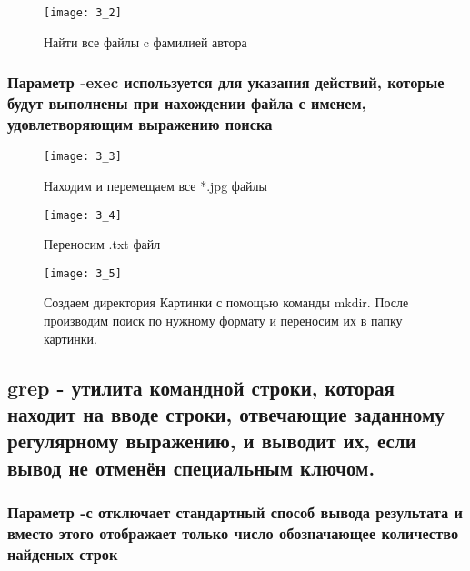 \begin{figure}[H]
	\begin{center}
		\texttt{[image: 3\_2]}
		\caption{Найти все файлы c фамилией автора} 
		\label{pic:pic_1} %
	\end{center}
\end{figure}

\subsubsection{Параметр -exec используется для указания действий, которые будут выполнены при нахождении файла с именем, удовлетворяющим выражению поиска}

\begin{figure}[H]
	\begin{center}
		\texttt{[image: 3\_3]}
		\caption{Находим и перемещаем все *.jpg файлы} 
		\label{pic:pic_1} %
	\end{center}
\end{figure}

\begin{figure}[H]
	\begin{center}
		\texttt{[image: 3\_4]}
		\caption{Переносим .txt файл} 
		\label{pic:pic_1} %
	\end{center}
\end{figure}

\begin{figure}[H]
	\begin{center}
		\texttt{[image: 3\_5]}
		\caption{Создаем директория Картинки с помощью команды mkdir. После производим поиск по нужному формату и переносим их в папку картинки.} 
		\label{pic:pic_1} %
	\end{center}
\end{figure} 

\subsection{grep - утилита командной строки, которая находит на вводе строки, отвечающие заданному регулярному выражению, и выводит их, если вывод не отменён специальным ключом.}
\subsubsection{Параметр -с отключает стандартный способ вывода результата и вместо этого отображает только число обозначающее количество найденых строк}
